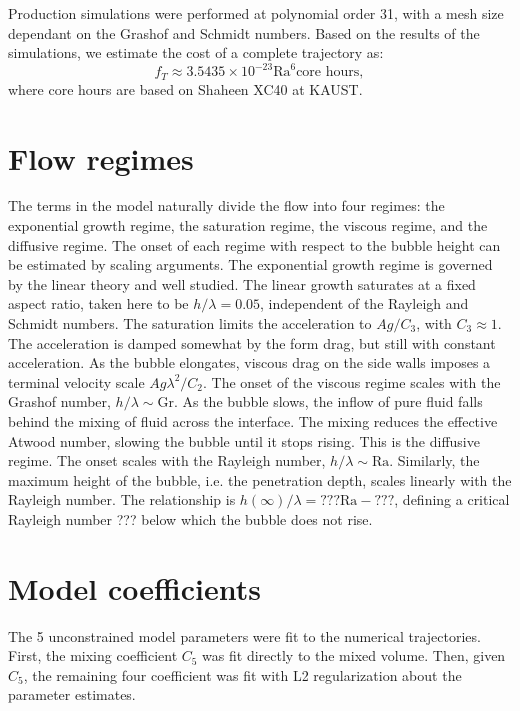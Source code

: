 Production simulations were performed at polynomial order 31, with a mesh size dependant on the Grashof and Schmidt numbers.
Based on the results of the simulations, we estimate the cost of a complete trajectory as:
\begin{equation}
f_T \approx 3.5435 \times 10^{-23} \text{Ra}^6 \text{core hours},
\end{equation}
where core hours are based on Shaheen XC40 at KAUST.

\section{Flow regimes}

The terms in the model naturally divide the flow into four regimes: the exponential growth regime, the saturation regime, the viscous regime, and the diffusive regime.
The onset of each regime with respect to the bubble height can be estimated by scaling arguments.
The exponential growth regime is governed by the linear theory and well studied.
The linear growth saturates at a fixed aspect ratio, taken here to be $h / \lambda = 0.05$, independent of the Rayleigh and Schmidt numbers. 
The saturation limits the acceleration to $A g / C_3$, with $C_3 \approx 1$.
The acceleration is damped somewhat by the form drag, but still with constant acceleration.
As the bubble elongates, viscous drag on the side walls imposes a terminal velocity scale $A g \lambda^2 / C_2$.
The onset of the viscous regime scales with the Grashof number, $h / \lambda \sim \text{Gr}$.
As the bubble slows, the inflow of pure fluid falls behind the mixing of fluid across the interface.
The mixing reduces the effective Atwood number, slowing the bubble until it stops rising.
This is the diffusive regime.
The onset scales with the Rayleigh number, $h / \lambda \sim \text{Ra}$.
Similarly, the maximum height of the bubble, i.e. the penetration depth, scales linearly with the Rayleigh number.
The relationship is $h(\infty)/\lambda = ??? \text{Ra} - ???$, defining a critical Rayleigh number ??? below which the bubble does not rise.

\section{Model coefficients}

The 5 unconstrained model parameters were fit to the numerical trajectories.
First, the mixing coefficient $C_5$ was fit directly to the mixed volume.
Then, given $C_5$, the remaining four coefficient was fit with L2 regularization about the parameter estimates.

